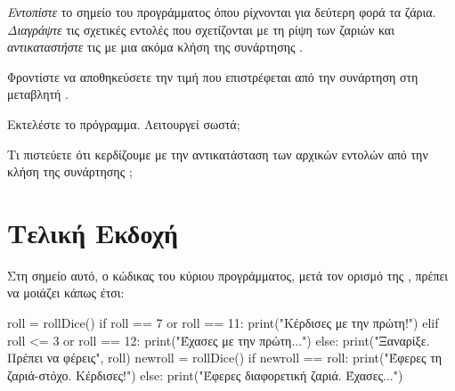 \documentclass[a4paper,11pt,oneside]{book}
\begin{document}
\begin{step}
\emph{Εντοπίστε} το σημείο του προγράμματος όπου ρίχνονται για δεύτερη φορά τα ζάρια. \emph{Διαγράψτε} τις σχετικές εντολές
που σχετίζονται με τη ρίψη των ζαριών και \emph{αντικαταστήστε} τις με μια ακόμα κλήση της συνάρτησης . 

\marginnote[18pt]{\iconcaution}
Φροντίστε να αποθηκεύσετε την τιμή που επιστρέφεται από την συνάρτηση στη μεταβλητή .




\clearpage
Εκτελέστε το πρόγραμμα. Λειτουργεί σωστά;

\marginnote[14pt]{\icondiscuss}
\dottedline

Τι πιστεύετε ότι κερδίζουμε με την αντικατάσταση των αρχικών εντολών από την κλήση της συνάρτησης ;

\marginnote[14pt]{\icondiscuss}
\dottedline

\dottedline
\end{step}



\section{Τελική Εκδοχή}

Στη σημείο αυτό, ο κώδικας του κύριου προγράμματος, μετά τον ορισμό της , πρέπει να μοιάζει κάπως έτσι:

\begin{pyplain}
roll = rollDice()
if roll == 7 or roll == 11:
    print("Κέρδισες με την πρώτη!")
elif roll <= 3 or roll == 12:
    print("Έχασες με την πρώτη...") 
else:
    print("Ξαναρίξε. Πρέπει να φέρεις", roll)
    newroll = rollDice()
    if newroll == roll:
        print("Έφερες τη ζαριά-στόχο. Κέρδισες!")
    else:
        print("Έφερες διαφορετική ζαριά. Έχασες...")
\end{pyplain}
\end{document}
